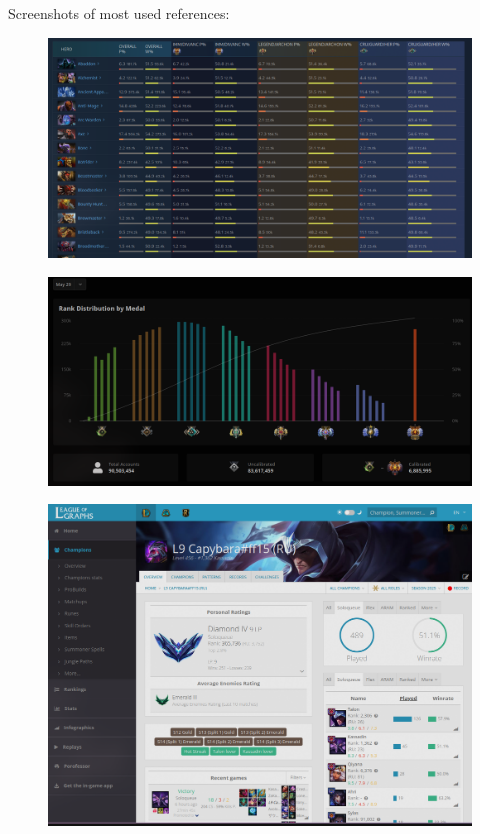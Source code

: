         Screenshots of most used references:

    \begin{figure}[ht]
        \centering
        \includegraphics[width=1\textwidth]{images/references/OpenDota1}
    \end{figure}

    \begin{figure}[ht]
        \centering
        \includegraphics[width=1\textwidth]{images/references/Stratz}
    \end{figure}

    \begin{figure}[ht]
        \centering
        \includegraphics[width=1\textwidth]{images/references/LoG}
    \end{figure}

